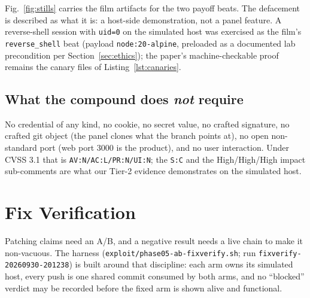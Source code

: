 \documentclass[journal]{IEEEtran}
\begin{document}
Fig.~\ref{fig:stills} carries the film artifacts for the two payoff beats.
The defacement is described as what it is: a host-side demonstration, not a
panel feature. A reverse-shell session with \texttt{uid=0} on the simulated
host was exercised as the film's \texttt{reverse\_shell} beat (payload
\texttt{node:20-alpine}, preloaded as a documented lab precondition per
Section~\ref{sec:ethics}); the paper's machine-checkable proof remains the
canary files of Listing~\ref{lst:canaries}.

\subsection{What the compound does \emph{not} require}

No credential of any kind, no cookie, no secret value, no crafted signature,
no crafted git object (the panel clones what the branch points at), no open
non-standard port (web port 3000 is the product), and no user interaction.
Under CVSS 3.1 that is \texttt{AV:N/AC:L/PR:N/UI:N}; the \texttt{S:C} and the
High/High/High impact sub-comments are what our Tier-2 evidence demonstrates
on the simulated host.

\section{Fix Verification}
\label{sec:fix}

Patching claims need an A/B, and a negative result needs a live chain to make
it non-vacuous. The harness (\texttt{exploit/}\allowbreak\texttt{phase05-ab-fixverify.sh};
run \texttt{fixverify-20260930-201238}) is built around that discipline: each
arm owns its simulated host, every push is one shared commit consumed by both
arms, and no ``blocked'' verdict may be recorded before the fixed arm is shown
alive and functional.
\end{document}
